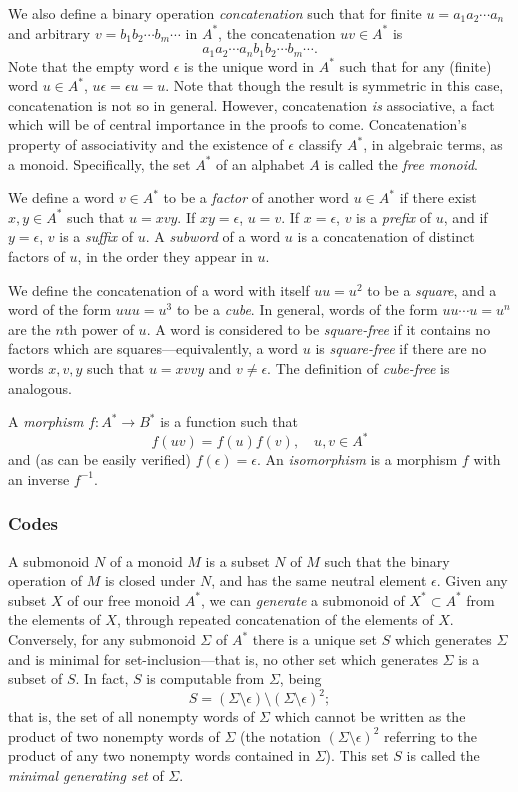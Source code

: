 \documentclass[letterpaper,12pt]{article}
\begin{document}
We also define a binary operation \emph{concatenation} such that for finite $u = a_1 a_2 \cdots a_n$ and arbitrary $v = b_1 b_2 \cdots b_m \cdots$ in $A^*$, the concatenation $uv \in A^*$ is
\[
	a_1 a_2 \cdots a_n b_1 b_2 \cdots b_m \cdots.
\]
Note that the empty word $\epsilon$ is the unique word in $A^*$ such that for any (finite) word $u \in A^*$, $u\epsilon = \epsilon u = u$. Note that though the result is symmetric in this case, concatenation is not so in general. However, concatenation \emph{is} associative, a fact which will be of central importance in the proofs to come. Concatenation's property of associativity and the existence of $\epsilon$ classify $A^*$, in algebraic terms, as a monoid. Specifically, the set $A^*$ of an alphabet $A$ is called the \emph{free monoid}.

We define a word $v \in A^*$ to be a \emph{factor} of another word $u \in A^*$ if there exist $x, y \in A^*$ such that $u = xvy$. If $xy = \epsilon$, $u = v$. If $x = \epsilon$, $v$ is a \emph{prefix} of $u$, and if $y = \epsilon$, $v$ is a \emph{suffix} of $u$. A \emph{subword} of a word $u$ is a concatenation of distinct factors of $u$, in the order they appear in $u$.

We define the concatenation of a word with itself $uu = u^2$ to be a \emph{square}, and a word of the form $uuu = u^3$ to be a \emph{cube}. In general, words of the form $uu\cdots u = u^n$ are the $n$th power of $u$. A word is considered to be \emph{square-free} if it contains no factors which are squares---equivalently, a word $u$ is \emph{square-free} if there are no words $x,v,y$ such that $u = xvvy$ and $v \neq \epsilon$. The definition of \emph{cube-free} is analogous.

A \emph{morphism} $f : A^* \rightarrow B^*$ is a function such that
\[
	f(uv) = f(u)f(v), \quad u,v \in A^*
\]
and (as can be easily verified) $f(\epsilon) = \epsilon$. An \emph{isomorphism} is a morphism $f$ with an inverse $f^{-1}$.

\subsubsection*{Codes}

A submonoid $N$ of a monoid $M$ is a subset $N$ of $M$ such that the binary operation of $M$ is closed under $N$, and has the same neutral element $\epsilon$. Given any subset $X$ of our free monoid $A^*$, we can \emph{generate} a submonoid of $X^* \subset A^*$ from the elements of $X$, through repeated concatenation of the elements of $X$. Conversely, for any submonoid $\Sigma$ of $A^*$ there is a unique set $S$ which generates $\Sigma$ and is minimal for set-inclusion---that is, no other set which generates $\Sigma$ is a subset of $S$. In fact, $S$ is computable from $\Sigma$, being
\[
	S = (\Sigma \setminus \epsilon) \setminus (\Sigma \setminus \epsilon)^2;
\]
that is, the set of all nonempty words of $\Sigma$ which cannot be written as the product of two nonempty words of $\Sigma$ (the notation $(\Sigma \setminus \epsilon)^2$ referring to the product of any two nonempty words contained in $\Sigma$). This set $S$ is called the \emph{minimal generating set} of $\Sigma$.
\end{document}
